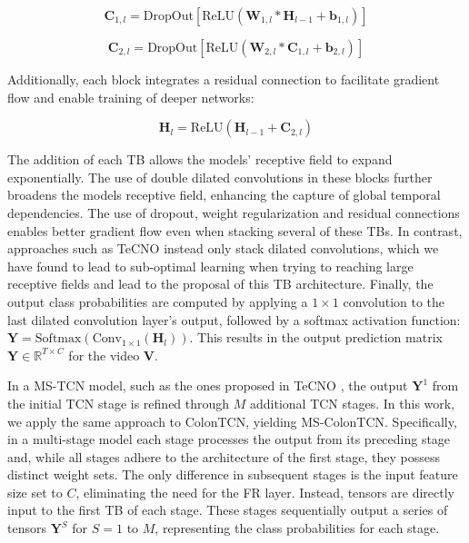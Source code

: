 \begin{equation}
\mathbf{C}_{1,l} = \text{DropOut}[\text{ReLU}(\mathbf{W}_{1,l} * \mathbf{H}_{l-1} + \mathbf{b}_{1,l})]
\end{equation}

\begin{equation}
\mathbf{C}_{2,l} = \text{DropOut}[\text{ReLU}(\mathbf{W}_{2,l} * \mathbf{C}_{1,l} + \mathbf{b}_{2,l})]
\end{equation}

Additionally, each block integrates a residual connection to facilitate gradient flow and enable training of deeper networks:

\begin{equation}
\mathbf{H}_l = \text{ReLU}(\mathbf{H}_{l-1} + \mathbf{C}_{2,l})
\end{equation}

The addition of each TB allows the models' receptive field to expand exponentially. The use of double dilated convolutions in these blocks further broadens the models receptive field, enhancing the capture of global temporal dependencies. The use of dropout, weight regularization and residual connections enables better gradient flow even when stacking several of these TBs. In contrast, approaches such as TeCNO \cite{czempiel2020tecno} instead only stack dilated convolutions, which we have found to lead to sub-optimal learning when trying to reaching large receptive fields and lead to the proposal of this TB architecture. Finally, the output class probabilities are computed by applying a \(1 \times 1\) convolution to the last dilated convolution layer's output, followed by a softmax activation function: $ \mathbf{Y} = \text{Softmax}(\text{Conv}_{1 \times 1}(\mathbf{H}_l)) $. This results in the output prediction matrix \( \mathbf{Y} \in \mathbb{R}^{T \times C} \) for the video \( \mathbf{V}\).

In a MS-TCN model, such as the ones proposed in TeCNO \cite{czempiel2020tecno}, the output \( \mathbf{Y}^1 \) from the initial TCN stage is refined through \( M \) additional TCN stages. In this work, we apply the same approach to ColonTCN, yielding MS-ColonTCN. Specifically, in a multi-stage model each stage processes the output from its preceding stage and, while all stages adhere to the architecture of the first stage, they possess distinct weight sets. The only difference in subsequent stages is the input feature size set to \( C \), eliminating the need for the FR layer. Instead, tensors are directly input to the first TB of each stage. These stages sequentially output a series of tensors \( \mathbf{Y}^S \) for \( S=1 \) to \( M \), representing the class probabilities for each stage.

